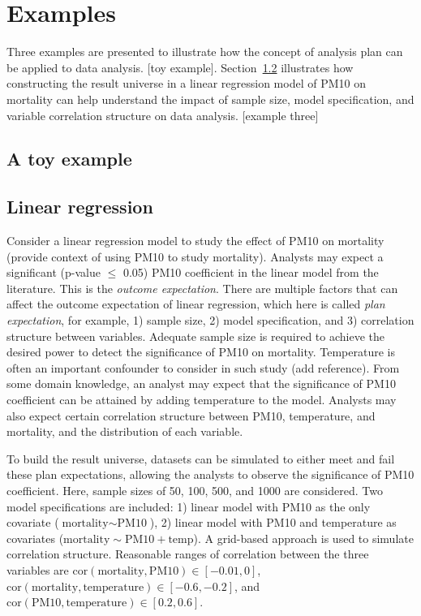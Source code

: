 \documentclass[
]{jds}
\begin{document}
\section{Examples}\label{sec-examples}

Three examples are presented to illustrate how the concept of analysis
plan can be applied to data analysis. {[}toy example{]}.
Section~\ref{sec-linear-reg} illustrates how constructing the result
universe in a linear regression model of PM10 on mortality can help
understand the impact of sample size, model specification, and variable
correlation structure on data analysis. {[}example three{]}

\subsection{A toy example}\label{a-toy-example}

\subsection{Linear regression}\label{sec-linear-reg}

Consider a linear regression model to study the effect of PM10 on
mortality (provide context of using PM10 to study mortality). Analysts
may expect a significant (p-value \(\le\) 0.05) PM10 coefficient in the
linear model from the literature. This is the \emph{outcome
expectation}. There are multiple factors that can affect the outcome
expectation of linear regression, which here is called \emph{plan
expectation}, for example, 1) sample size, 2) model specification, and
3) correlation structure between variables. Adequate sample size is
required to achieve the desired power to detect the significance of PM10
on mortality. Temperature is often an important confounder to consider
in such study (add reference). From some domain knowledge, an analyst
may expect that the significance of PM10 coefficient can be attained by
adding temperature to the model. Analysts may also expect certain
correlation structure between PM10, temperature, and mortality, and the
distribution of each variable.

To build the result universe, datasets can be simulated to either meet
and fail these plan expectations, allowing the analysts to observe the
significance of PM10 coefficient. Here, sample sizes of 50, 100, 500,
and 1000 are considered. Two model specifications are included: 1)
linear model with PM10 as the only covariate
(\(\text{mortality} \sim \text{PM10}\)), 2) linear model with PM10 and
temperature as covariates
(\(\text{mortality} \sim \text{PM10} + \text{temp}\)). A grid-based
approach is used to simulate correlation structure. Reasonable ranges of
correlation between the three variables are
\(\text{cor}(\text{mortality}, \text{PM10}) \in [-0.01, 0]\),
\(\text{cor}(\text{mortality}, \text{temperature}) \in [-0.6, -0.2]\),
and \(\text{cor}(\text{PM10}, \text{temperature}) \in [0.2, 0.6]\).
\end{document}
